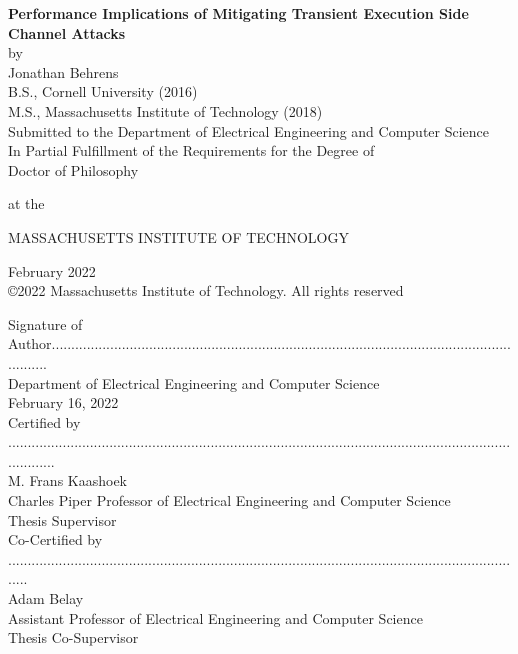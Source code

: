 \begin{titlepage}

    \centering
    \onehalfspacing
    {\large \bf Performance Implications of Mitigating Transient Execution Side Channel Attacks} \\[1\baselineskip]
    by \\[0.25\baselineskip]
    {\large Jonathan Behrens} \\[1\baselineskip]

    B.S., Cornell University (2016) \\
    M.S., Massachusetts Institute of Technology (2018) \\[1\baselineskip]

    Submitted to the Department of Electrical Engineering and Computer Science \\
    In Partial Fulfillment of the Requirements for the Degree of\\[0.5\baselineskip]

    Doctor of Philosophy

    at the 

    MASSACHUSETTS INSTITUTE OF TECHNOLOGY

    February 2022 \\[0.5\baselineskip]

    \copyright 2022 Massachusetts Institute of Technology. All rights reserved \\[0.25in]

    \singlespacing
    \raggedleft
    \small

    Signature of Author................................................................................................................................ \\
    Department of Electrical Engineering and Computer Science \\
    February 16, 2022 \\[1\baselineskip]

    Certified by ............................................................................................................................................. \\
    M. Frans Kaashoek \\
    Charles Piper Professor of Electrical Engineering and Computer Science \\
    Thesis Supervisor \\[1\baselineskip]

    Co-Certified by ...................................................................................................................................... \\
    Adam Belay \\
    Assistant Professor of Electrical Engineering and Computer Science \\
    Thesis Co-Supervisor \\[1\baselineskip]


\end{titlepage}
